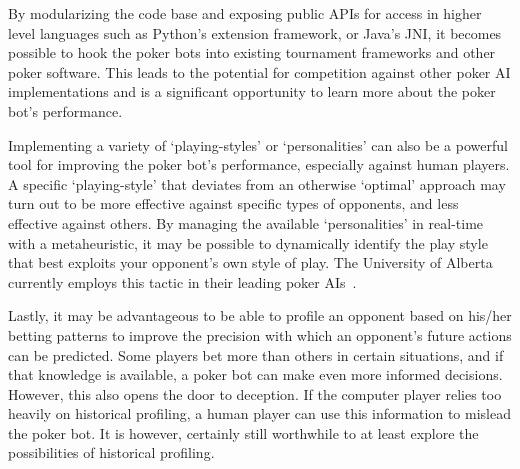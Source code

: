 By modularizing the code base and exposing public APIs for access in higher level languages such as Python's extension framework, or Java's JNI, it becomes possible to hook the poker bots into existing tournament frameworks and other poker software.
This leads to the potential for competition against other poker AI implementations and is a significant opportunity to learn more about the poker bot's performance.

Implementing a variety of `playing-styles' or `personalities' can also be a powerful tool for improving the poker bot's performance, especially against human players.
A specific `playing-style' that deviates from an otherwise `optimal' approach may turn out to be more effective against specific types of opponents, and less effective against others.
By managing the available `personalities' in real-time with a metaheuristic, it may be possible to dynamically identify the play style that best exploits your opponent's own style of play.
The University of Alberta currently employs this tactic in their leading poker AIs~\cite{PolarisCoached2007}.

Lastly, it may be advantageous to be able to profile an opponent based on his/her betting patterns to improve the precision with which an opponent's future actions can be predicted.
Some players bet more than others in certain situations, and if that knowledge is available, a poker bot can make even more informed decisions.
However, this also opens the door to deception.
If the computer player relies too heavily on historical profiling, a human player can use this information to mislead the poker bot.
It is however, certainly still worthwhile to at least explore the possibilities of historical profiling.

